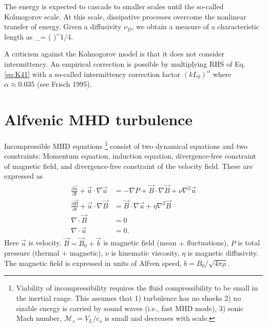 \documentclass[usenatbib,twocolumn]{aastex63}
\begin{document}
The energy is expected to cascade to smaller scales until the so-called Kolmogorov scale.
At this scale, dissipative processes overcome the nonlinear transfer of energy.
Given a diffusivity $\nu_D$, we obtain a measure of a characteristic length as
\be
\ell_\nu = \left(  \right)^{1/4}.
\ee

A criticism against the Kolmogorov model is that it does not consider intermittency.
An empirical correction is possible by multiplying RHS of Eq. \eqref{eq:K41} with a so-called intermittency correction factor $(k L_0)^\alpha$ where $\alpha \approx 0.035$ (see Frisch 1995).


\section{Alfvenic MHD turbulence}\label{sect:mhd_theory}

Incompressible MHD equations%
\footnote{
    Viability of incompressibility requires the fluid compressibility to be small in the inertial range.
    This assumes that 
    1) turbulence has no shocks
    2) no sizable energy is carried by sound waves (i.e., fast MHD mode),
    3) sonic Mach number, $\mathcal{M}_s = V_L/c_s$ is small and decreases with scale.
}
consist of two dynamical equations and two constraints:
Momentum equation,
induction equation,
divergence-free constraint of magnetic field,
and divergence-free constraint of the velocity field.
These are expressed as
\begin{align}\begin{split}
    \frac{\partial \vec{u}}{\partial t} + \vec{u} \cdot \nabla \vec{u} &= -\nabla P + \vec{B} \cdot \nabla \vec{B} + \nu \nabla^2 \vec{u} \\
    \frac{\partial \vec{B}}{\partial t} + \vec{u} \cdot \nabla \vec{B} &= \vec{B} \cdot \nabla \vec{u} + \eta \nabla^2 \vec{B} \\
    \nabla \cdot \vec{B} &= 0\\
    \nabla \cdot \vec{u} &= 0.
\end{split}\end{align}
Here $\vec{u}$ is velocity, $\vec{B} = \vec{B}_0 + \vec{b}$ is magnetic field (mean $+$ fluctuations), $P$ is total pressure (thermal $+$ magnetic), $\nu$ is kinematic viscosity, $\eta$ is magnetic diffusivity.
The magnetic field is expressed in units of Alfven speed, $b = B_0/\sqrt{4\pi \rho}$.
\end{document}
